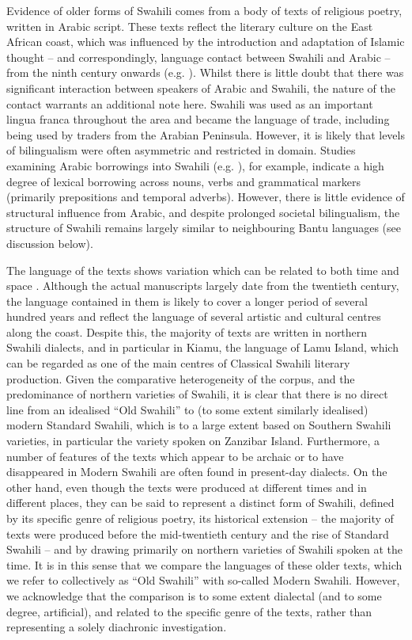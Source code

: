 \documentclass[output=paper]{langscibook}
\begin{document}
Evidence of older forms of Swahili comes from a body of texts of religious poetry, written in Arabic script. These texts reflect the literary culture on the East African coast, which was influenced by the introduction and adaptation of Islamic thought -- and correspondingly, language contact between Swahili and Arabic -- from the ninth century onwards (e.g. \citealt{Whiteley1969, Mbaabu1978, Mugane2015}). Whilst there is little doubt that there was significant interaction between speakers of Arabic and Swahili, the nature of the contact warrants an additional note here. Swahili was used as an important lingua franca throughout the area and became the language of trade, including being used by traders from the Arabian Peninsula. However, it is likely that levels of bilingualism were often asymmetric and restricted in domain. Studies examining Arabic borrowings into Swahili (e.g. \citealt{Krumm1940, Lodhi2000, Baldi2012, Mwaliwa2018}), for example, indicate a high degree of lexical borrowing across nouns, verbs and grammatical markers (primarily prepositions and temporal adverbs). However, there is little evidence of structural influence from Arabic, and despite prolonged societal bilingualism, the structure of Swahili remains largely similar to neighbouring Bantu languages (see discussion below). 

The language of the texts shows variation which can be related to both time and space \citep{Miehe1979}. Although the actual manuscripts largely date from the twentieth century, the language contained in them is likely to cover a longer period of several hundred years and reflect the language of several artistic and cultural centres along the coast. Despite this, the majority of texts are written in northern Swahili dialects, and in particular in Kiamu, the language of Lamu Island, which can be regarded as one of the main centres of Classical Swahili literary production. Given the comparative heterogeneity of the corpus, and the predominance of northern varieties of Swahili, it is clear that there is no direct line from an idealised ``Old Swahili'' to (to some extent similarly idealised) modern Standard Swahili, which is to a large extent based on Southern Swahili varieties, in particular the variety spoken on Zanzibar Island. Furthermore, a number of features of the texts which appear to be archaic or to have disappeared in Modern Swahili are often found in present-day dialects. On the other hand, even though the texts were produced at different times and in different places, they can be said to represent a distinct form of Swahili, defined by its specific genre of religious poetry, its historical extension -- the majority of texts were produced before the mid-twentieth century and the rise of Standard Swahili -- and by drawing primarily on northern varieties of Swahili spoken at the time. It is in this sense that we compare the languages of these older texts, which we refer to collectively as ``Old Swahili'' with so-called Modern Swahili. However, we acknowledge that the comparison is to some extent dialectal (and to some degree, artificial), and related to the specific genre of the texts, rather than representing a solely diachronic investigation. 
\end{document}
